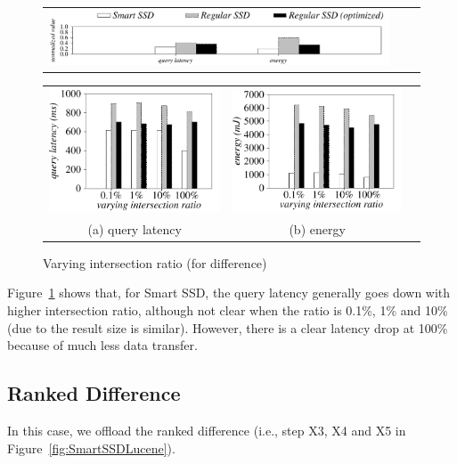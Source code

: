 \begin{figure}[tbp]
\centering
\begin{tabular}{ccc}
\includegraphics[width=0.95\columnwidth]{figures/banner.pdf}
\end{tabular}
\renewcommand{\tabcolsep}{0.1mm}
\begin{tabular}{ccc}
\includegraphics[width=0.5\columnwidth]{figures/Difference-time-VaryInterRatio-equal-eps-converted-to.pdf}&
\includegraphics[width=0.5\columnwidth]{figures/Difference-energy-VaryInterRatio-equal-eps-converted-to.pdf}\\
(a) query latency & (b) energy
\end{tabular}
\caption{Varying intersection ratio (for difference)}
\label{fig:varyInterRatioDifference}
\end{figure}

Figure~\ref{fig:varyInterRatioDifference} shows that, for Smart SSD, the query latency generally goes down with higher intersection ratio, although not clear when the ratio is 0.1\%, 1\% and 10\% (due to the result size is similar). However, there is a clear latency drop at 100\% because of much less data transfer.
\subsection{Ranked Difference}\label{sec:expRankedDifference}
In this case, we offload the ranked difference (i.e., step X3, X4 and X5 in Figure~\ref{fig:SmartSSDLucene}).

